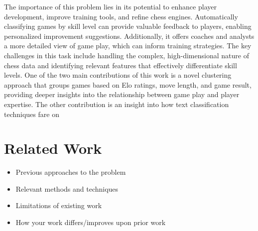 \documentclass[conference]{IEEEtran}
\begin{document}
The importance of this problem lies in its potential to enhance player development, improve training tools, and refine chess engines. Automatically classifying games by skill level can provide valuable feedback to players, enabling personalized improvement suggestions. Additionally, it offers coaches and analysts a more detailed view of game play, which can inform training strategies. The key challenges in this task include handling the complex, high-dimensional nature of chess data and identifying relevant features that effectively differentiate skill levels. One of the two main contributions of this work is a novel clustering approach that groups games based on Elo ratings, move length, and game result, providing deeper insights into the relationship between game play and player expertise. The other contribution is an insight into how text classification techniques fare on 

\section{Related Work}
\begin{itemize}
\item Previous approaches to the problem
\item Relevant methods and techniques
\item Limitations of existing work
\item How your work differs/improves upon prior work
\end{itemize}
\end{document}
